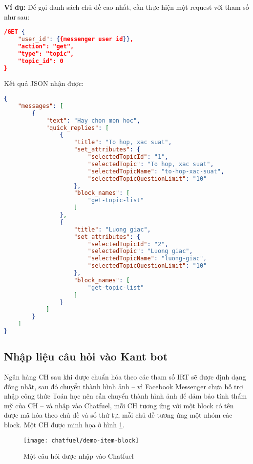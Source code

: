 \noindent\textbf{Ví dụ:} Để gọi danh sách chủ đề cao nhất, cần thực hiện một request với tham số như sau:
\begin{lstlisting}[language=json]
/GET {
	"user_id": {{messenger user id}},
	"action": "get",
	"type": "topic",
	"topic_id": 0
}
\end{lstlisting}\par
Kết quả JSON nhận được:
\begin{lstlisting}[language=json]
{
    "messages": [
        {
            "text": "Hay chon mon hoc",
            "quick_replies": [
                {
                    "title": "To hop, xac suat",
                    "set_attributes": {
                        "selectedTopicId": "1",
                        "selectedTopic": "To hop, xac suat",
                        "selectedTopicName": "to-hop-xac-suat",
                        "selectedTopicQuestionLimit": "10"
                    },
                    "block_names": [
                        "get-topic-list"
                    ]
                },
                {
                    "title": "Luong giac",
                    "set_attributes": {
                        "selectedTopicId": "2",
                        "selectedTopic": "Luong giac",
                        "selectedTopicName": "luong-giac",
                        "selectedTopicQuestionLimit": "10"
                    },
                    "block_names": [
                        "get-topic-list"
                    ]
                }
            ]
        }
    ]
}
\end{lstlisting}
\subsection{Nhập liệu câu hỏi vào Kant bot}
Ngân hàng CH sau khi được chuẩn hóa theo các tham số IRT sẽ được định dạng đồng nhất, sau đó chuyển thành hình ảnh – vì Facebook Messenger chưa hỗ trợ nhập công thức Toán học nên cần chuyển thành hình ảnh để đảm bảo tính thẩm mỹ của CH – và nhập vào Chatfuel, mỗi CH tương ứng với một block có tên được mã hóa theo chủ đề và số thứ tự, mỗi chủ đề tương ứng một nhóm các block. Một CH được minh họa ở hình \ref{fig:fig-c3-demo-item-block}.
\begin{figure}[htb!]\centering
	\texttt{[image: chatfuel/demo-item-block]}
	\caption{Một câu hỏi được nhập vào Chatfuel}
	\label{fig:fig-c3-demo-item-block}
\end{figure}\par


